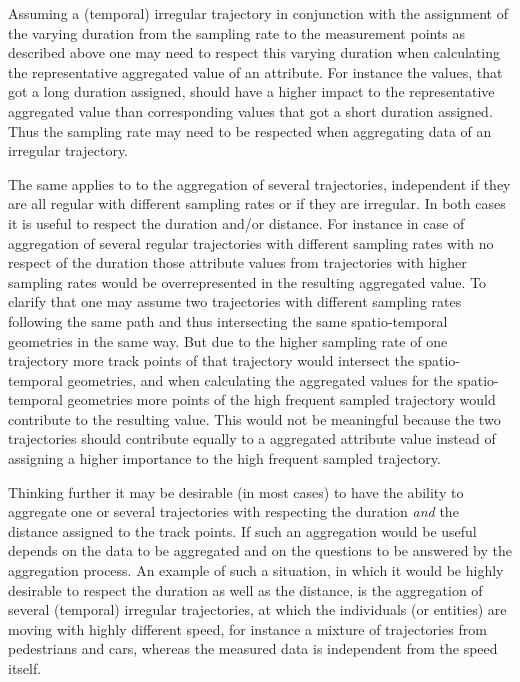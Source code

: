 \documentclass[12pt, oneside, a4paper]{scrbook}
\begin{document}
\par\medskip
Assuming a (temporal) irregular trajectory in conjunction with the assignment of the varying duration from the sampling rate to the measurement points as described above one may need to respect this varying duration when calculating the representative aggregated value of an attribute. 
For instance the values, that got a long duration assigned, should have a higher impact to the representative aggregated value than corresponding values that got a short duration assigned.
Thus the sampling rate may need to be respected when aggregating data of an irregular trajectory. 
\par\medskip
The same applies to to the aggregation of several trajectories, independent if they are all regular with different sampling rates or if they are irregular. 
In both cases it is useful to respect the duration and/or distance. 
For instance in case of aggregation of several regular trajectories with different sampling rates with no respect of the duration those attribute values from trajectories with higher sampling rates would be overrepresented in the resulting aggregated value.
To clarify that one may assume two trajectories with different sampling rates following the same path and thus intersecting the same spatio-temporal geometries in the same way.
But due to the higher sampling rate of one trajectory more track points of that trajectory would intersect the spatio-temporal geometries, and when calculating the aggregated values for the spatio-temporal geometries more points of the high frequent sampled trajectory would contribute to the resulting value. 
This would not be meaningful because the two trajectories should contribute equally to a aggregated attribute value instead of assigning a higher importance to the high frequent sampled trajectory.
\par\medskip
Thinking further it may be desirable (in most cases) to have the ability to aggregate one or several trajectories with respecting the duration \textit{and} the distance assigned to the track points. 
If such an aggregation would be useful depends on the data to be aggregated and on the questions to be answered by the aggregation process. 
An example of such a situation, in which it would be highly desirable to respect the duration as well as the distance, is the aggregation of several (temporal) irregular trajectories, at which the individuals (or entities) are moving with highly different speed, for instance a mixture of trajectories from pedestrians and cars, whereas the measured data is independent from the speed itself.
\end{document}
